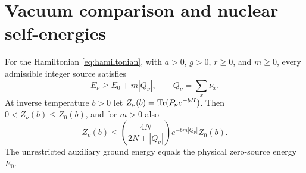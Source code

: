 \section{Vacuum comparison and nuclear self-energies}
\label{sec:comparison}

\begin{theorem}
\label{thm:main}
For the Hamiltonian \eqref{eq:hamiltonian}, with $a>0$, $g>0$,
$r\ge0$, and $m\ge0$, every admissible integer source satisfies
\begin{equation}
 E_\nu\ge E_0+m|Q_\nu|,\qquad Q_\nu=\sum_x\nu_x.
 \label{eq:main}
\end{equation}
At inverse temperature $b>0$ let $Z_\nu(b)=\operatorname{Tr}(P_\nu e^{-bH})$.
Then $0<Z_\nu(b)\le Z_0(b)$, and for $m>0$ also
\begin{equation}
 Z_\nu(b)\le\binom{4N}{2N+|Q_\nu|}
                         e^{-bm|Q_\nu|}Z_0(b).
 \label{eq:thermal}
\end{equation}
The unrestricted auxiliary ground energy equals the physical
zero-source energy $E_0$.
\end{theorem}
